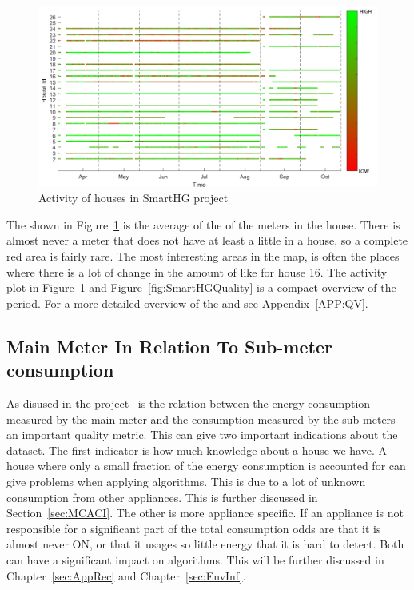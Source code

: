 \begin{figure}[H]
\centering
\includegraphics[width=1\textwidth]{billeder/ActivityBig.png}
\caption{Activity of houses in SmartHG project}
\label{fig:ActivityMap}
\end{figure}

The  shown in Figure~\ref{fig:ActivityMap} is the average of the  of the meters in the house. There is almost never a meter that does not have at least a little  in a house, so a complete red area is fairly rare. The most interesting areas in the  map, is often the places where there is a lot of change in the amount of  like for house 16. The activity plot in Figure~\ref{fig:ActivityMap} and Figure~\ref{fig:SmartHGQuality} is a compact overview of the period. For a more detailed overview of the  and  see Appendix~\ref{APP:QV}. 

\subsection{Main Meter In Relation To Sub-meter consumption}
\label{sec:MMIRTSM}
As disused in the  project~\citep{RefWorks:21} is the relation between the energy consumption measured by the main meter and the consumption measured by the sub-meters an important quality metric. This can give two important indications about the dataset. The first indicator is how much knowledge about a house we have. A house where only a small fraction of the energy consumption is accounted for can give problems when applying  algorithms. This is due to a lot of unknown consumption from other appliances. This is further discussed in Section~\ref{sec:MCACI}. The other is more appliance specific. If an appliance is not responsible for a significant part of the total consumption odds are that it is almost never ON, or that it usages so little energy that it is hard to detect. Both can have a significant impact on  algorithms. This will be further discussed in Chapter~\ref{sec:AppRec} and Chapter~\ref{sec:EnvInf}.  


